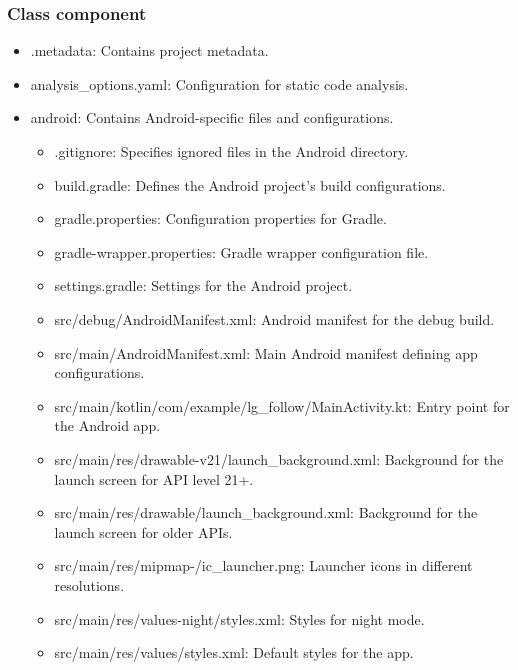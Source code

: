 \documentclass[conference]{IEEEtran}
\begin{document}
\subsubsection{Class component}
\begin{itemize}
    \item .metadata: Contains project metadata. \\
    \item analysis\_options.yaml: Configuration for static code analysis. \\

    \item android: Contains Android-specific files and configurations.
    \begin{itemize}
        \item .gitignore: Specifies ignored files in the Android directory. \\
        \item build.gradle: Defines the Android project’s build configurations. \\
        \item gradle.properties: Configuration properties for Gradle. \\
        \item gradle-wrapper.properties: Gradle wrapper configuration file. \\
        \item settings.gradle: Settings for the Android project. \\
        \item src/debug/AndroidManifest.xml: Android manifest for the debug build. \\
        \item src/main/AndroidManifest.xml: Main Android manifest defining app configurations. \\
        \item src/main/kotlin/com/example/lg\_follow/MainActivity.kt: Entry point for the Android app. \\
        \item src/main/res/drawable-v21/launch\_background.xml: Background for the launch screen for API level 21+. \\
        \item src/main/res/drawable/launch\_background.xml: Background for the launch screen for older APIs. \\
        \item src/main/res/mipmap-\*/ic\_launcher.png: Launcher icons in different resolutions. \\
        \item src/main/res/values-night/styles.xml: Styles for night mode. \\
        \item src/main/res/values/styles.xml: Default styles for the app. \\
    \end{itemize}


\end{itemize}
\end{document}
